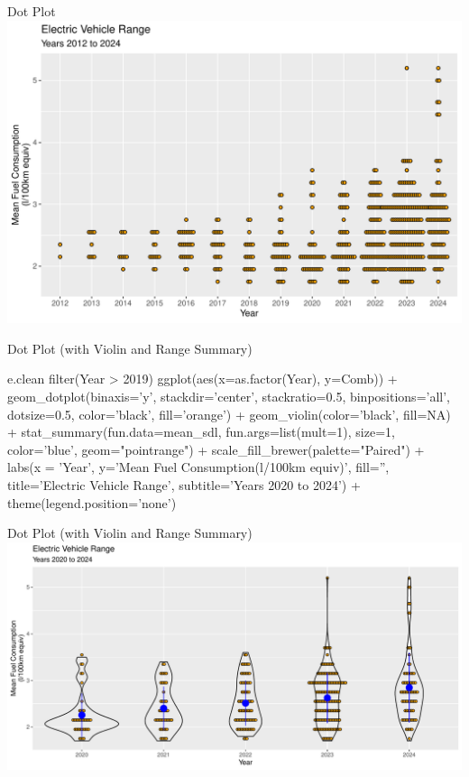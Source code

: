 \documentclass[ignorenonframetext,xcolor=x11names]{beamer}
\begin{document}
\begin{frame}{Dot Plot}
  \includegraphics[width=\textwidth]{fuel.dotplot.pdf}
\end{frame}

\begin{frame}[fragile]{Dot Plot (with Violin and Range Summary)}
\footnotesize
\begin{Rcode}
e.clean %
  filter(Year > 2019) %
  ggplot(aes(x=as.factor(Year), y=Comb)) +
    geom_dotplot(binaxis='y', 
                 stackdir='center', stackratio=0.5,
                 binpositions='all', dotsize=0.5, 
                 color='black', fill='orange') +
    geom_violin(color='black', fill=NA) + 
    stat_summary(fun.data=mean_sdl, 
                 fun.args=list(mult=1), 
                 size=1, color='blue', 
                 geom="pointrange") +
    scale_fill_brewer(palette="Paired") +
    labs(x = 'Year', 
         y='Mean Fuel Consumption\n(l/100km equiv)', 
         fill='', 
         title='Electric Vehicle Range', 
         subtitle='Years 2020 to 2024') +
     theme(legend.position='none')
\end{Rcode}
\end{frame}

\begin{frame}{Dot Plot (with Violin and Range Summary)}
  \includegraphics[width=\textwidth]{fuel.dotplotjviolinsummary.pdf}
\end{frame}
\end{document}
